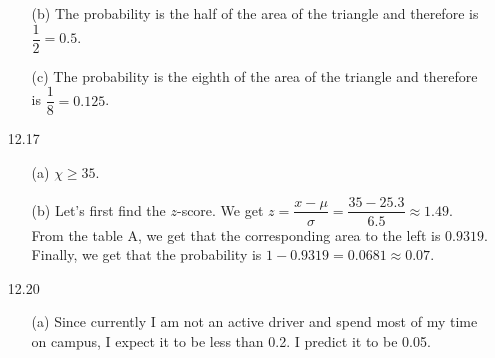 \documentclass[11pt, a4paper]{article}
\begin{document}
\begin{itemize}
\begin{itemize}
\item[(b)]
The probability is the half of the area of the triangle and therefore is $\dfrac{1}{2} = 0.5$.

\begin{figure}[h]
    \centering
\end{figure}

\item[]

\item[(c)]
The probability is the eighth of the area of the triangle and therefore is $\dfrac{1}{8} = 0.125$.

\begin{figure}[h]
    \centering
\end{figure}
\end{itemize}

\item[]
\item[]

\item[12.17]
\begin{itemize}
\item[(a)]
$\chi \geq 35$.

\item[]

\item[(b)]
Let's first find the $z$-score. We get $z = \dfrac{x - \mu}{\sigma} = \dfrac{35 - 25.3}{6.5} \approx 1.49$.\\
From the table A, we get that the corresponding area to the left is $0.9319$. Finally, we
get that the probability is $1 - 0.9319 = 0.0681 \approx 0.07$.
\end{itemize}

\item[]
\item[]

\item[12.20]
\begin{itemize}
\item[(a)]
Since currently I am not an active driver and spend most of my time on campus, I expect it to be less than 0.2.
I predict it to be 0.05.


\end{itemize}
\end{itemize}
\end{document}
